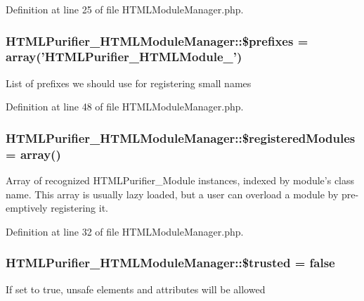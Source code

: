 Definition at line 25 of file H\+T\+M\+L\+Module\+Manager.\+php.

\hypertarget{classHTMLPurifier__HTMLModuleManager_ada129f26d42ceea1c83cd771b0fdb261}{
\subsubsection[{\$prefixes}]{\setlength{\rightskip}{0pt plus 5cm}H\+T\+M\+L\+Purifier\+\_\+\+H\+T\+M\+L\+Module\+Manager\+::\$prefixes = array('H\+T\+M\+L\+Purifier\+\_\+\+H\+T\+M\+L\+Module\+\_\+')}}\label{classHTMLPurifier__HTMLModuleManager_ada129f26d42ceea1c83cd771b0fdb261}
List of prefixes we should use for registering small names 

Definition at line 48 of file H\+T\+M\+L\+Module\+Manager.\+php.

\hypertarget{classHTMLPurifier__HTMLModuleManager_ac7baacae235048bc75eeb962de4fd096}{
\subsubsection[{\$registered\+Modules}]{\setlength{\rightskip}{0pt plus 5cm}H\+T\+M\+L\+Purifier\+\_\+\+H\+T\+M\+L\+Module\+Manager\+::\$registered\+Modules = array()}}\label{classHTMLPurifier__HTMLModuleManager_ac7baacae235048bc75eeb962de4fd096}
Array of recognized H\+T\+M\+L\+Purifier\+\_\+\+Module instances, indexed by module's class name. This array is usually lazy loaded, but a user can overload a module by pre-\/emptively registering it. 

Definition at line 32 of file H\+T\+M\+L\+Module\+Manager.\+php.

\hypertarget{classHTMLPurifier__HTMLModuleManager_ac672c14e87065bab6cbc76edcda40315}{
\subsubsection[{\$trusted}]{\setlength{\rightskip}{0pt plus 5cm}H\+T\+M\+L\+Purifier\+\_\+\+H\+T\+M\+L\+Module\+Manager\+::\$trusted = false}}\label{classHTMLPurifier__HTMLModuleManager_ac672c14e87065bab6cbc76edcda40315}
If set to true, unsafe elements and attributes will be allowed 

